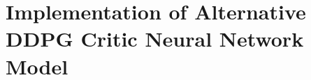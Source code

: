 \section{Implementation of Alternative DDPG Critic Neural Network Model}\label{app:implementation_alt_critic_model}

